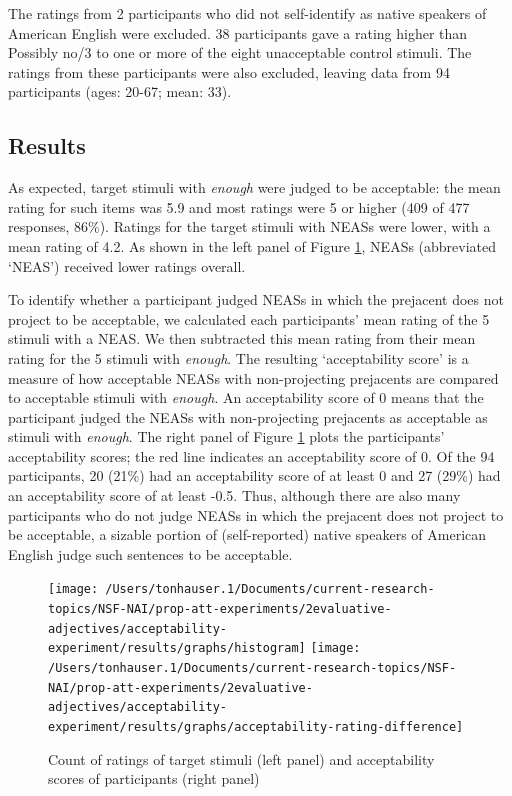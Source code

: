 \documentclass[11pt,fleqn]{article}
\newcommand{\6}{\mbox{$[\hspace*{-.6mm}[$}}
\newcommand{\9}{\mbox{$]\hspace*{-.6mm}]$}}
\begin{document}
The ratings from 2 participants who did not self-identify as native speakers of American English were excluded. 38 participants gave a rating higher than Possibly no/3 to one or more of the eight unacceptable control stimuli. The ratings from these participants were also excluded, leaving data from 94 participants (ages: 20-67; mean: 33). 

\subsection{Results}

As expected, target stimuli with {\em enough} were judged to be acceptable: the mean rating for such items was 5.9 and most ratings were 5 or higher (409 of 477 responses,
86\%). Ratings for the target stimuli with NEASs were lower, with a mean rating of 4.2. As shown in the left panel of Figure \ref{f-acc}, NEASs (abbreviated `NEAS') received lower ratings overall.

To identify whether a participant judged NEASs in which the prejacent does not project to be acceptable, we calculated each participants' mean rating of the 5 stimuli with a NEAS. We then subtracted this mean rating from their mean rating for the 5 stimuli with {\em enough}. The resulting `acceptability score' is a measure of how acceptable NEASs with non-projecting prejacents are compared to acceptable stimuli with {\em enough}. An acceptability score of 0 means that the participant judged the NEASs with non-projecting prejacents as acceptable as stimuli with {\em enough}. The right panel of Figure \ref{f-acc} plots the participants' acceptability scores; the red line indicates an acceptability score of 0. Of the 94 participants, 20 (21\%) had an acceptability score of at least 0 and 27 (29\%) had an acceptability score of at least -0.5. Thus, although there are also many participants who do not judge NEASs in which the prejacent does not project to be acceptable, a sizable portion of (self-reported) native speakers of American English judge such sentences to be acceptable.

\begin{figure}[h!]

\hspace*{-.5cm}\texttt{[image: /Users/tonhauser.1/Documents/current-research-topics/NSF-NAI/prop-att-experiments/2evaluative-adjectives/acceptability-experiment/results/graphs/histogram]} \texttt{[image: /Users/tonhauser.1/Documents/current-research-topics/NSF-NAI/prop-att-experiments/2evaluative-adjectives/acceptability-experiment/results/graphs/acceptability-rating-difference]}


\caption{Count of ratings of target stimuli (left panel) and acceptability scores of participants (right panel)}\label{f-acc}

\end{figure}
\end{document}
